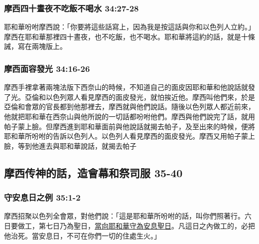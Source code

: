 \begin{table}
\subsubsection{摩西四十晝夜不吃飯不喝水 34:27-28}
耶和華吩咐摩西說：「你要將這些話寫上，因為我是按這話與你和以色列人立約。」摩西在耶和華那裡四十晝夜，也不吃飯，也不喝水。耶和華將這約的話，就是十條誡，寫在兩塊版上。

\subsubsection{摩西面容發光 34:16-26}
摩西手裡拿著兩塊法版下西奈山的時候，不知道自己的面皮因耶和華和他說話就發了光。亞倫和以色列眾人看見摩西的面皮發光，就怕挨近他。摩西叫他們來，於是亞倫和會眾的官長都到他那裡去，摩西就與他們說話。隨後以色列眾人都近前來，他就把耶和華在西奈山與他所說的一切話都吩咐他們。摩西與他們說完了話，就用帕子蒙上臉。但摩西進到耶和華面前與他說話就揭去帕子，及至出來的時候，便將耶和華所吩咐的告訴以色列人。以色列人看見摩西的面皮發光。摩西又用帕子蒙上臉，等到他進去與耶和華說話，就揭去帕子

\subsection{摩西传神的話，造會幕和祭司服 35-40}
\subsubsection{守安息日之例 35:1-2}
摩西招聚以色列全會眾，對他們說：「這是耶和華所吩咐的話，叫你們照著行。六日要做工，第七日乃為聖日，\underline{當向耶和華守為安息聖日}。凡這日之內做工的，必把他治死。當安息日，不可在你們一切的住處生火。」


\end{table}
